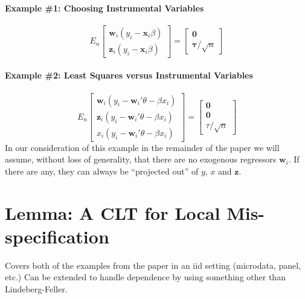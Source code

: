 \documentclass[12pt]{article}
\theoremstyle{definition}
\begin{document}
\paragraph{Example \#1: Choosing Instrumental Variables}
 \begin{equation}
  E_n\left[\begin{array}{c}
    \mathbf{w}_i(y_i - \mathbf{x}_i \beta)\\
     \mathbf{z}_i(y_i - \mathbf{x}_i \beta)
  \end{array} \right] = \left[ \begin{array}{c}\mathbf{0} \\ \boldsymbol{\tau}/\sqrt{n} \end{array}\right] 
 \end{equation}
 
 \paragraph{Example \#2: Least Squares versus Instrumental Variables}
\begin{equation}
    E_n\left[\begin{array}{c}
    \mathbf{w}_i(y_i - \mathbf{w}_i' \theta  - \beta x_i)\\
    \mathbf{z}_i(y_i - \mathbf{w}_i' \theta  - \beta x_i)\\
    x_i(y_i - \mathbf{w}_i' \theta  - \beta x_i)
    \end{array}\right] = \left[\begin{array}{c} \mathbf{0} \\ \mathbf{0} \\ \tau/\sqrt{n}  \end{array} \right]
\end{equation}
In our consideration of this example in the remainder of the paper we will assume, without loss of generality, that there are no exogenous regressors $\mathbf{w}_i$. If there are any, they can always be ``projected out'' of $y$, $x$ and $\mathbf{z}$.

\section{Lemma: A CLT for Local Mis-specification}
Covers both of the examples from the paper in an iid setting (microdata, panel, etc.) Can be extended to handle dependence by using something other than Lindeberg-Feller.
\end{document}
